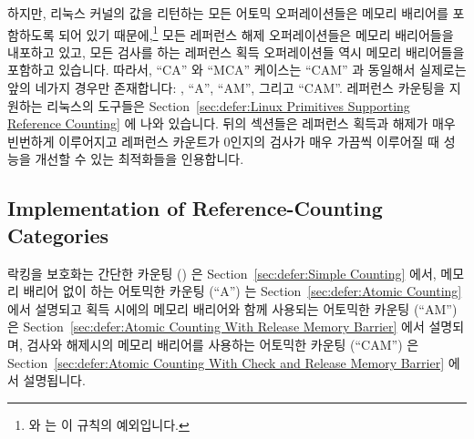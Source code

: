 하지만, 리눅스 커널의 값을 리턴하는 모든 어토믹 오퍼레이션들은 메모리 배리어를
포함하도록 되어 있기 때문에,\footnote{
	 와  는 이 규칙의 예외입니다.}
모든 레퍼런스 해제 오퍼레이션들은 메모리 배리어들을 내포하고 있고, 모든 검사를
하는 레퍼런스 획득 오퍼레이션들 역시 메모리 배리어들을 포함하고 있습니다.
따라서, ``CA'' 와 ``MCA'' 케이스는 ``CAM'' 과 동일해서 실제로는 앞의 네가지
경우만 존재합니다:
, ``A'', ``AM'', 그리고 ``CAM''.
레퍼런스 카운팅을 지원하는 리눅스의 도구들은
Section~\ref{sec:defer:Linux Primitives Supporting Reference Counting} 에 나와
있습니다.
뒤의 섹션들은 레퍼런스 획득과 해제가 매우 빈번하게 이루어지고 레퍼런스 카운트가
0인지의 검사가 매우 가끔씩 이루어질 때 성능을 개선할 수 있는 최적화들을
인용합니다.
\iffalse

However, because all Linux-kernel atomic operations that return a
value are defined to contain memory barriers,\footnote{
	With \co{atomic_read()} and \co{ATOMIC_INIT()} being the
	exceptions that prove the rule.}
all release operations
contain memory barriers, and all checked acquisition operations also
contain memory barriers.
Therefore, cases ``CA'' and ``MCA'' are equivalent to ``CAM'', so that
there are sections below for only the first four cases:
\makebox{``-''}, ``A'', ``AM'', and ``CAM''.
The Linux primitives that support reference counting are presented in
Section~\ref{sec:defer:Linux Primitives Supporting Reference Counting}.
Later sections cite optimizations that can improve performance
if reference acquisition and release is very frequent, and the
reference count need be checked for zero only very rarely.
\fi

\subsection{Implementation of Reference-Counting Categories}
\label{sec:defer:Implementation of Reference-Counting Categories}

락킹을 보호화는 간단한 카운팅 () 은
Section~\ref{sec:defer:Simple Counting} 에서,
메모리 배리어 없이 하는 어토믹한 카운팅 (``A'') 는
Section~\ref{sec:defer:Atomic Counting} 에서 설명되고
획득 시에의 메모리 배리어와 함께 사용되는 어토믹한 카운팅 (``AM'') 은
Section~\ref{sec:defer:Atomic Counting With Release Memory Barrier} 에서
설명되며, 검사와 해제시의 메모리 배리어를 사용하는 어토믹한 카운팅 (``CAM'') 은
Section~\ref{sec:defer:Atomic Counting With Check and Release Memory Barrier}
에서 설명됩니다.
\iffalse

